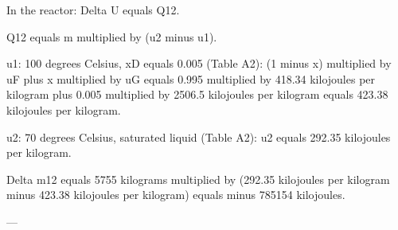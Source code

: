 In the reactor:  
Delta U equals Q12.  

Q12 equals m multiplied by (u2 minus u1).  

u1:  
100 degrees Celsius, xD equals 0.005 (Table A2):  
(1 minus x) multiplied by uF plus x multiplied by uG  
equals 0.995 multiplied by 418.34 kilojoules per kilogram plus 0.005 multiplied by 2506.5 kilojoules per kilogram  
equals 423.38 kilojoules per kilogram.  

u2:  
70 degrees Celsius, saturated liquid (Table A2):  
u2 equals 292.35 kilojoules per kilogram.  

Delta m12 equals 5755 kilograms multiplied by (292.35 kilojoules per kilogram minus 423.38 kilojoules per kilogram)  
equals minus 785154 kilojoules.  

---
